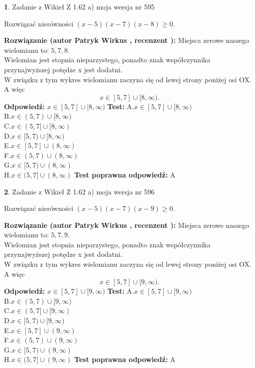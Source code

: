 \documentclass[12pt, a4paper]{article}
\theoremstyle{definition} %
\newtheorem{zad}{}
\newcommand{\zadStart}[1]{\begin{zad}#1\newline}
\newcommand{\zadStop}{\end{zad}}
\newcommand{\rozwStart}[2]{\noindent \textbf{Rozwiązanie (autor #1 , recenzent #2): }\newline}
\newcommand{\rozwStop}{\newline}
\newcommand{\odpStart}{\noindent \textbf{Odpowiedź:}\newline}
\newcommand{\odpStop}{\newline}
\newcommand{\testStart}{\noindent \textbf{Test:}\newline}
\newcommand{\testStop}{\newline}
\newcommand{\kluczStart}{\noindent \textbf{Test poprawna odpowiedź:}\newline}
\newcommand{\kluczStop}{\newline}
\begin{document}
\zadStart{Zadanie z Wikieł Z 1.62 a) moja wersja nr 595}

Rozwiązać nierówności $(x-5)(x-7)(x-8)\ge0$.
\zadStop
\rozwStart{Patryk Wirkus}{}
Miejsca zerowe naszego wielomianu to: $5, 7, 8$.\\
Wielomian jest stopnia nieparzystego, ponadto znak współczynnika przy\linebreak najwyższej potędze x jest dodatni.\\ W związku z tym wykres wielomianu zaczyna się od lewej strony poniżej osi OX. A więc $$x \in [5,7] \cup [8,\infty).$$
\rozwStop
\odpStart
$x \in [5,7] \cup [8,\infty)$
\odpStop
\testStart
A.$x \in [5,7] \cup [8,\infty)$\\
B.$x \in (5,7) \cup [8,\infty)$\\
C.$x \in (5,7] \cup [8,\infty)$\\
D.$x \in [5,7) \cup [8,\infty)$\\
E.$x \in [5,7] \cup (8,\infty)$\\
F.$x \in (5,7) \cup (8,\infty)$\\
G.$x \in [5,7) \cup (8,\infty)$\\
H.$x \in (5,7] \cup (8,\infty)$
\testStop
\kluczStart
A
\kluczStop



\zadStart{Zadanie z Wikieł Z 1.62 a) moja wersja nr 596}

Rozwiązać nierówności $(x-5)(x-7)(x-9)\ge0$.
\zadStop
\rozwStart{Patryk Wirkus}{}
Miejsca zerowe naszego wielomianu to: $5, 7, 9$.\\
Wielomian jest stopnia nieparzystego, ponadto znak współczynnika przy\linebreak najwyższej potędze x jest dodatni.\\ W związku z tym wykres wielomianu zaczyna się od lewej strony poniżej osi OX. A więc $$x \in [5,7] \cup [9,\infty).$$
\rozwStop
\odpStart
$x \in [5,7] \cup [9,\infty)$
\odpStop
\testStart
A.$x \in [5,7] \cup [9,\infty)$\\
B.$x \in (5,7) \cup [9,\infty)$\\
C.$x \in (5,7] \cup [9,\infty)$\\
D.$x \in [5,7) \cup [9,\infty)$\\
E.$x \in [5,7] \cup (9,\infty)$\\
F.$x \in (5,7) \cup (9,\infty)$\\
G.$x \in [5,7) \cup (9,\infty)$\\
H.$x \in (5,7] \cup (9,\infty)$
\testStop
\kluczStart
A
\kluczStop
\end{document}
